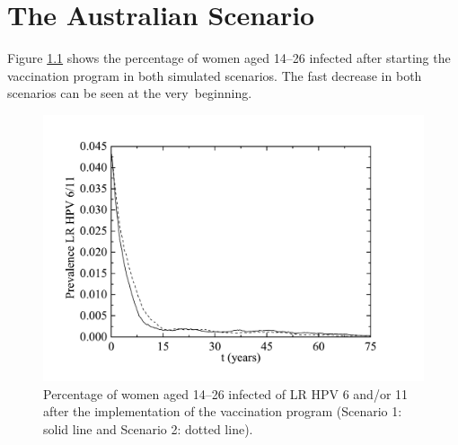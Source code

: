 \chapter{The Australian Scenario}\label{Australiano}

Figure \ref{fig:lrmujeres} shows the percentage of women aged 14--26 infected after starting the vaccination program in both simulated scenarios. The fast decrease in both scenarios can be seen at the very~beginning.
\vspace{-24pt}

\begin{figure}[H]
	\centering
	\includegraphics[scale=0.4]{FigLRwomen.pdf}
	\vspace{-12pt}
	\caption{Percentage of women aged 14--26 infected of LR HPV 6 and/or 11 after the 
implementation of the vaccination program (Scenario 1: solid line and Scenario 2: dotted line).}
	\label{fig:lrmujeres}
\end{figure}

